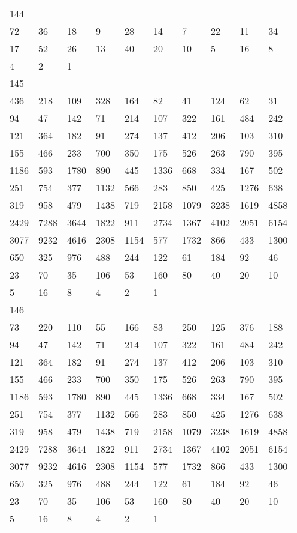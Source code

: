 \begin{longtable}{*{10}{l}}
144&&&&&&&&&\\
72& 36& 18& 9& 28& 14& 7& 22& 11& 34\\
17& 52& 26& 13& 40& 20& 10& 5& 16& 8\\
4& 2& 1& \\

145&&&&&&&&&\\
436& 218& 109& 328& 164& 82& 41& 124& 62& 31\\
94& 47& 142& 71& 214& 107& 322& 161& 484& 242\\
121& 364& 182& 91& 274& 137& 412& 206& 103& 310\\
155& 466& 233& 700& 350& 175& 526& 263& 790& 395\\
1186& 593& 1780& 890& 445& 1336& 668& 334& 167& 502\\
251& 754& 377& 1132& 566& 283& 850& 425& 1276& 638\\
319& 958& 479& 1438& 719& 2158& 1079& 3238& 1619& 4858\\
2429& 7288& 3644& 1822& 911& 2734& 1367& 4102& 2051& 6154\\
3077& 9232& 4616& 2308& 1154& 577& 1732& 866& 433& 1300\\
650& 325& 976& 488& 244& 122& 61& 184& 92& 46\\
23& 70& 35& 106& 53& 160& 80& 40& 20& 10\\
5& 16& 8& 4& 2& 1& \\

146&&&&&&&&&\\
73& 220& 110& 55& 166& 83& 250& 125& 376& 188\\
94& 47& 142& 71& 214& 107& 322& 161& 484& 242\\
121& 364& 182& 91& 274& 137& 412& 206& 103& 310\\
155& 466& 233& 700& 350& 175& 526& 263& 790& 395\\
1186& 593& 1780& 890& 445& 1336& 668& 334& 167& 502\\
251& 754& 377& 1132& 566& 283& 850& 425& 1276& 638\\
319& 958& 479& 1438& 719& 2158& 1079& 3238& 1619& 4858\\
2429& 7288& 3644& 1822& 911& 2734& 1367& 4102& 2051& 6154\\
3077& 9232& 4616& 2308& 1154& 577& 1732& 866& 433& 1300\\
650& 325& 976& 488& 244& 122& 61& 184& 92& 46\\
23& 70& 35& 106& 53& 160& 80& 40& 20& 10\\
5& 16& 8& 4& 2& 1& \\


\end{longtable}
